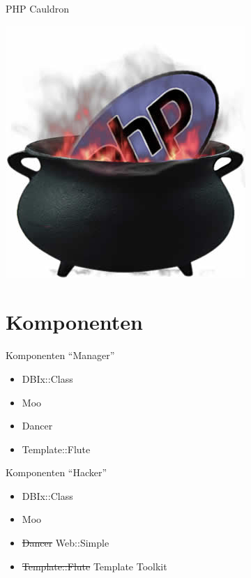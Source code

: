 \begin{frame}{PHP Cauldron}
  \begin{center}
    \includegraphics[width=\textwidth,height=0.8\textheight,keepaspectratio]{images/cauldron.jpg}
  \end{center}
\end{frame}

\section{Komponenten}
\begin{frame}{Komponenten ``Manager''}
  \begin{itemize}
  \item DBIx::Class
  \item Moo
  \item Dancer
  \item Template::Flute
  \end{itemize}
\end{frame}

\begin{frame}{Komponenten ``Hacker''}
  \begin{itemize}
  \item DBIx::Class
  \item Moo
  \item \sout{Dancer} Web::Simple
  \item \sout{Template::Flute} Template Toolkit
  \end{itemize}
\end{frame}

